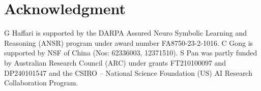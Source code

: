 \section*{Acknowledgment}
G Haffari is supported by the DARPA Assured Neuro Symbolic Learning and Reasoning (ANSR) program under award number FA8750-23-2-1016. C Gong is supported by NSF of China (Nos: 62336003, 12371510). S Pan was partly funded by Australian Research Council (ARC) under grants FT210100097 and DP240101547 and the CSIRO – National Science Foundation (US) AI Research Collaboration Program.